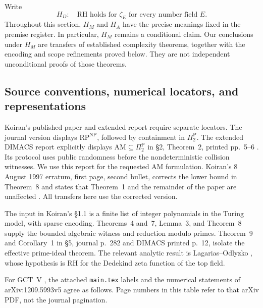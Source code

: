 \documentclass[11pt,a4paper]{article}
\begin{document}
Write
\[
 H_D:\quad \text{RH holds for $\zeta_E$ for every number field $E$.}
\]
Throughout this section, $H_M$ and $H_A$ have the precise meanings fixed
in the premise register. In particular, $H_M$ remains a conditional
claim. Our conclusions under $H_M$ are transfers of established
complexity theorems, together with the encoding and scope refinements
proved below. They are not independent unconditional proofs of those
theorems.

\subsection{Source conventions, numerical locators, and representations}

Koiran's published paper and extended report require separate locators.
The journal version \cite[\S2, Theorem~2, pp.~276--277]{K96} displays
$\mathrm{RP}^{\mathrm{NP}}$, followed by containment in
$\Pi_2^{\mathrm P}$. The extended DIMACS report explicitly displays
$\mathrm{AM}\subseteq\Pi_2^{\mathrm P}$ in \S2, Theorem~2,
printed pp.~5--6 \cite{K96TR}. Its protocol uses public randomness before
the nondeterministic collision witnesses. We use this report for the
requested AM formulation. Koiran's 8 August 1997 erratum, first page,
second bullet, corrects the lower bound in Theorem~8 and states that
Theorem~1 and the remainder of the paper are unaffected
\cite{K97Err}. All transfers here use the corrected version.

The input in Koiran's \S1.1 is a finite list of integer polynomials in
the Turing model, with sparse encoding. Theorems~4 and~7, Lemma~3, and
Theorem~8 supply the bounded algebraic witness and reduction modulo
primes. Theorem~9 and Corollary~1 in \S5, journal p.~282 and DIMACS
printed p.~12, isolate the effective prime-ideal theorem. The relevant
analytic result is Lagarias--Odlyzko \cite[Theorem~1.1]{LO77}, whose
hypothesis is RH for the Dedekind zeta function of the top field.

For GCT~V \cite{GCT5}, the attached \texttt{main.tex} labels and the
numerical statements of arXiv:1209.5993v5 agree as follows. Page numbers
in this table refer to that arXiv PDF, not the journal pagination.
\end{document}
